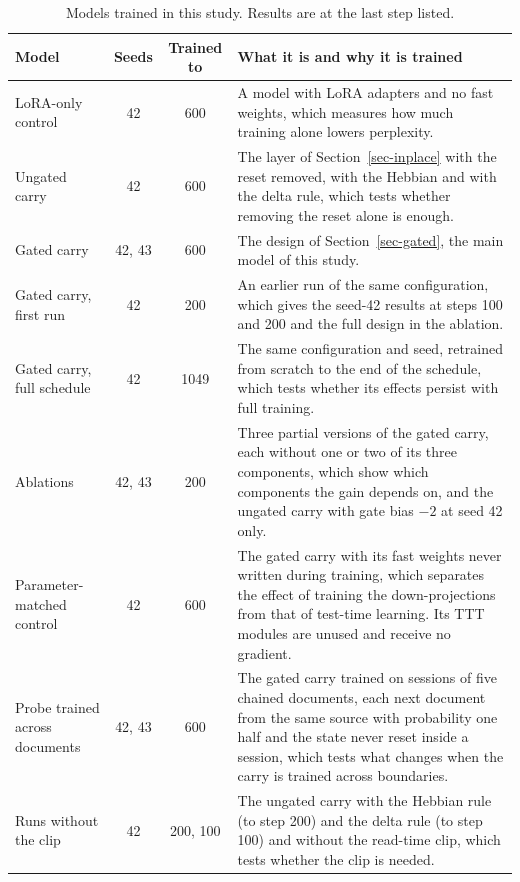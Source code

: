 \documentclass[10pt]{article} %
\begin{document}
\begin{table}[tbp]
  \centering
  \small
  \begin{tabularx}{\linewidth}{>{\raggedright\arraybackslash}p{3.3cm}cc>{\raggedright\arraybackslash}X}
    \toprule
    Model & Seeds & Trained to & What it is and why it is trained \\
    \midrule
    LoRA-only control & 42 & 600 & A model with LoRA adapters and no fast weights, which measures how much training alone lowers perplexity. \\
    Ungated carry & 42 & 600 & The layer of Section~\ref{sec-inplace} with the reset removed, with the Hebbian and with the delta rule, which tests whether removing the reset alone is enough. \\
    Gated carry & 42, 43 & 600 & The design of Section~\ref{sec-gated}, the main model of this study. \\
    Gated carry, first run & 42 & 200 & An earlier run of the same configuration, which gives the seed-42 results at steps 100 and 200 and the full design in the ablation. \\
    Gated carry, full schedule & 42 & 1049 & The same configuration and seed, retrained from scratch to the end of the schedule, which tests whether its effects persist with full training. \\
    Ablations & 42, 43 & 200 & Three partial versions of the gated carry, each without one or two of its three components, which show which components the gain depends on, and the ungated carry with gate bias $-2$ at seed 42 only. \\
    Parameter-matched control & 42 & 600 & The gated carry with its fast weights never written during training, which separates the effect of training the down-projections from that of test-time learning. Its TTT modules are unused and receive no gradient. \\
    Probe trained across documents & 42, 43 & 600 & The gated carry trained on sessions of five chained documents, each next document from the same source with probability one half and the state never reset inside a session, which tests what changes when the carry is trained across boundaries. \\
    Runs without the clip & 42 & 200, 100 & The ungated carry with the Hebbian rule (to step 200) and the delta rule (to step 100) and without the read-time clip, which tests whether the clip is needed. \\
    \bottomrule
  \end{tabularx}
    \caption{Models trained in this study. Results are at the last step listed.}
  \label{tab-models}
\end{table}
\end{document}
